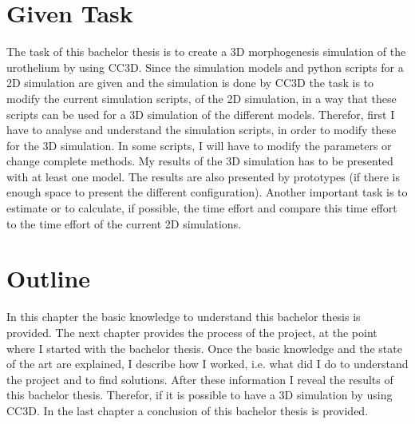 \section{Given Task}
The task of this bachelor thesis is to create a 3D morphogenesis simulation of the urothelium by using \ac{CC3D}. Since the simulation models and python scripts for a 2D simulation are given and the simulation is done by \ac{CC3D} the task is to modify the current simulation scripts, of the 2D simulation, in a way that these scripts can be used for a 3D simulation of the different models. \newline
Therefor, first I have to analyse and understand the simulation scripts, in order to modify these for the 3D simulation. In some scripts, I will have to modify the parameters or change complete methods. My results of the 3D simulation has to be presented with at least one model. The results are also presented by prototypes (if there is enough space to present the different configuration). Another important task is to estimate or to calculate, if possible, the time effort and compare this time effort to the time effort of the current 2D simulations.

\section{Outline}
In this chapter the basic knowledge to understand this bachelor thesis is provided. The next chapter provides the process of the project, at the point where I started with the bachelor thesis. Once the basic knowledge and the state of the art are explained, I describe how I worked, i.e. what did I do to understand the project and to find solutions. After these information I reveal the results of this bachelor thesis. Therefor, if it is possible to have a 3D simulation by using \ac{CC3D}. In the last chapter a conclusion of this bachelor thesis is provided.